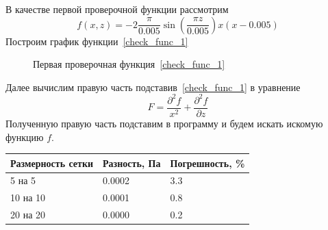 \documentclass[a4paper,14pt]{extarticle}
\begin{document}
В качестве первой проверочной функции рассмотрим
\begin{equation}
	f(x, z) = -2 \frac{\pi }{0.005} \sin{\left(\frac{\pi z}{0.005}\right)} x \left(x - 0.005\right)
	\label{check_func_1}
\end{equation}
Построим график функции~\eqref{check_func_1}
\begin{figure}[!htbp]
	\caption{Первая проверочная функция~\eqref{check_func_1}}
	\label{check_func_1_pic}
\end{figure}

\noindent Далее вычислим правую часть подставив~\eqref{check_func_1} в уравнение
\begin{equation*}
	F = \frac{\partial^2 f}{x^2} + \frac{\partial^2 f}{\partial z}
\end{equation*}
Полученную правую часть подставим в программу и будем искать искомую функцию $f$.

\begin{table}[!htbp]
	\begin{tabular}{|l|l|l|}
		\hline
		\multicolumn{1}{|c|}{Размерность сетки} & \multicolumn{1}{c|}{Разность, Па} & Погрешность, \% \\ \hline
		5 на 5                                  & 0.0002                              & 3.3            \\ \hline
		10 на 10                                & 0.0001                              & 0.8            \\ \hline
		20 на 20                                & 0.0000                              & 0.2            \\ \hline
	\end{tabular}
\end{table}
\end{document}
